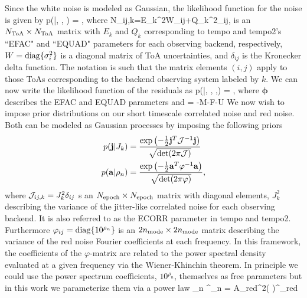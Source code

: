 Since the white noise is modeled as Gaussian, the likelihood function for the noise is given by
\be
p(|\boldsymbol{\epsilon}, , ) = ,
\ee
where 
\be
N_{ij,k}=E_{k}^2W_{ij}+Q_{k}^2\delta_{ij},
\ee
is an $N_{\rm ToA}\times N_{\rm ToA}$ matrix with $E_{k}$ and $Q_{k}$
corresponding to {\sc tempo} and {\sc tempo2}'s ``EFAC" and ``EQUAD" parameters for each observing backend, respectively, $W={\rm diag}\{\sigma_i^2\}$ is a diagonal matrix of ToA uncertainties, and $\delta_{ij}$ is the Kronecker delta function. The notation is such that the matrix elements $(i,j)$ apply to those ToAs corresponding to the backend observing system labeled by $k$. We can now write the likelihood function of the residuals as
\be
p(\delta{}|\boldsymbol{\epsilon}, , ,\boldsymbol{\phi}) = ,
\ee
where $\boldsymbol{\phi}$ describes the EFAC and EQUAD parameters and 
\be
{} = \delta{}-M\boldsymbol{\epsilon}-F-U
\ee
We now wish to impose prior distributions on our short timescale correlated noise and red noise. Both can be modeled as Gaussian processes by imposing the following priors
\begin{align}
p(\mathbf{j}|J_{k}) &= \frac{\exp\left( -\frac{1}{2}\mathbf{j}^{T}\mathcal{J}^{-1}\mathbf{j} \right)}{\sqrt{\det(2\pi\mathcal{J})}}\\
p(\mathbf{a}|\rho_{n}) &= \frac{\exp\left( -\frac{1}{2}\mathbf{a}^{T}\varphi^{-1}\mathbf{a} \right)}{\sqrt{\det(2\pi\varphi)}},
\end{align}
where $\mathcal{J}_{ij,k} = J_{k}^{2}\delta_{ij}$ s an $N_{\rm epoch}\times N_{\rm
epoch}$ matrix with diagonal elements, $J_{k}^{2}$ describing the variance of
the jitter-like correlated noise for each observing backend. It is also
referred to as the ECORR parameter in {\sc tempo} and {\sc tempo2}. Furthermore $\varphi_{ij} = {\rm diag}\{10^{\rho_{n}}\}$ is an $2n_{\rm mode}\times 2n_{\rm mode}$ matrix describing the variance of the red noise Fourier coefficients at each frequency. In this framework, the coefficients of the $\varphi$-matrix are related to the power spectral density evaluated at a given frequency via the Wiener-Khinchin theorem. In principle we could use the power spectrum coefficients, $10^{\rho_{n}}$, themselves as free parameters but in this work we parameterize them via a power law
\be
\varphi_{n} ^{\rho_{n}} =  A_{\rm red}^2\left(  \right)^{\gamma_{\rm red}}
